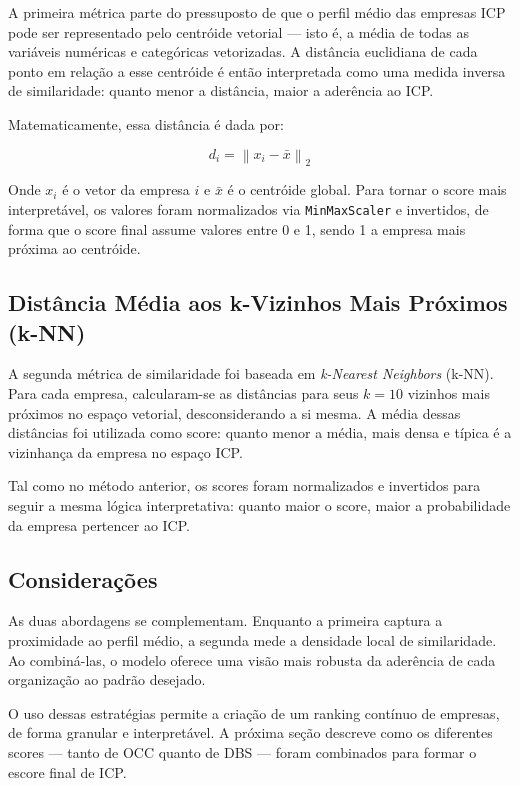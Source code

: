 A primeira métrica parte do pressuposto de que o perfil médio das empresas ICP pode ser representado pelo centróide vetorial — isto é, a média de todas as variáveis numéricas e categóricas vetorizadas. A distância euclidiana de cada ponto em relação a esse centróide é então interpretada como uma medida inversa de similaridade: quanto menor a distância, maior a aderência ao ICP.

Matematicamente, essa distância é dada por:

\begin{equation}
d_i = \left\| x_i - \bar{x} \right\|_2
\end{equation}

Onde $x_i$ é o vetor da empresa $i$ e $\bar{x}$ é o centróide global. Para tornar o score mais interpretável, os valores foram normalizados via \texttt{MinMaxScaler} e invertidos, de forma que o score final assume valores entre 0 e 1, sendo 1 a empresa mais próxima ao centróide.

\subsection{\textbf{Distância Média aos k-Vizinhos Mais Próximos (k-NN)}}

A segunda métrica de similaridade foi baseada em \textit{k-Nearest Neighbors} (k-NN). Para cada empresa, calcularam-se as distâncias para seus $k = 10$ vizinhos mais próximos no espaço vetorial, desconsiderando a si mesma. A média dessas distâncias foi utilizada como score: quanto menor a média, mais densa e típica é a vizinhança da empresa no espaço ICP.

Tal como no método anterior, os scores foram normalizados e invertidos para seguir a mesma lógica interpretativa: quanto maior o score, maior a probabilidade da empresa pertencer ao ICP.

\subsection{\textbf{Considerações}}

As duas abordagens se complementam. Enquanto a primeira captura a proximidade ao perfil médio, a segunda mede a densidade local de similaridade. Ao combiná-las, o modelo oferece uma visão mais robusta da aderência de cada organização ao padrão desejado.

O uso dessas estratégias permite a criação de um ranking contínuo de empresas, de forma granular e interpretável. A próxima seção descreve como os diferentes scores — tanto de OCC quanto de DBS — foram combinados para formar o escore final de ICP.


